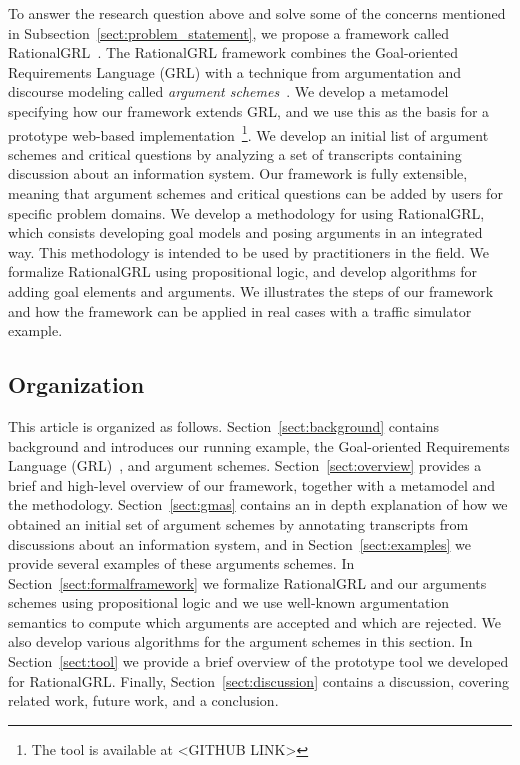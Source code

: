 To answer the research question above and solve some of the concerns mentioned in Subsection~\ref{sect:problem_statement}, we propose a framework called RationalGRL~\cite{}. The RationalGRL framework combines the Goal-oriented Requirements Language (GRL) with a technique from argumentation and discourse modeling called \emph{argument schemes}~\cite{walton-etal2004}. %
We develop a metamodel specifying how our framework extends GRL, and we use this as the basis for a prototype web-based implementation~\footnote{The tool is available at <GITHUB LINK>}. %
We develop an initial list of argument schemes and critical questions by analyzing a set of transcripts containing discussion about an information system. Our framework is fully extensible, meaning that argument schemes and critical questions can be added by users for specific problem domains. We develop a methodology for using RationalGRL, which consists developing goal models and posing arguments in an integrated way. This methodology is intended to be used by practitioners in the field. We formalize RationalGRL using propositional logic, and develop algorithms for adding goal elements and arguments. We illustrates the steps of our framework  and how the framework can be applied in real cases with a traffic simulator example.

\subsection{Organization} %

This article is organized as follows. Section~\ref{sect:background} contains background and introduces our running example, the Goal-oriented Requirements Language (GRL)~\cite{Amyot:2010:EGM:1841349.1841356}, and argument schemes. Section~\ref{sect:overview} provides a brief and high-level overview of our framework, together with a metamodel and the methodology. Section~\ref{sect:gmas} contains an in depth explanation of how we obtained an initial set of argument schemes by annotating transcripts from discussions about an information system, and in Section~\ref{sect:examples} we provide several examples of these arguments schemes. In Section~\ref{sect:formalframework} we formalize RationalGRL and our arguments schemes using propositional logic and we use well-known argumentation semantics to compute which arguments are accepted and which are rejected. We also develop various algorithms for the argument schemes in this section. In Section~\ref{sect:tool} we provide a brief overview of the prototype tool we developed for RationalGRL. Finally, Section~\ref{sect:discussion} contains a discussion, covering related work, future work, and a conclusion.